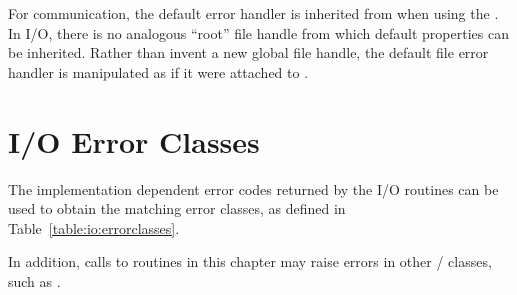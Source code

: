 \begin{rationale}
For communication, the default error handler is inherited
from  when using the \wpm{}\mpitermindex{\wpm}.
In I/O, there is no analogous ``root'' file handle
from which default properties can be inherited.
Rather than invent a new global file handle,
the default file error handler is manipulated as if
it were attached to .
\end{rationale}


\section{I/O Error Classes}
\label{sec:io-errors}

The implementation dependent error codes returned by the I/O routines
can be used to obtain the matching 
error classes, as defined in Table~\ref{table:io:errorclasses}.

In addition, calls to routines in this chapter may raise
errors in other \MPI/ classes, such as .


